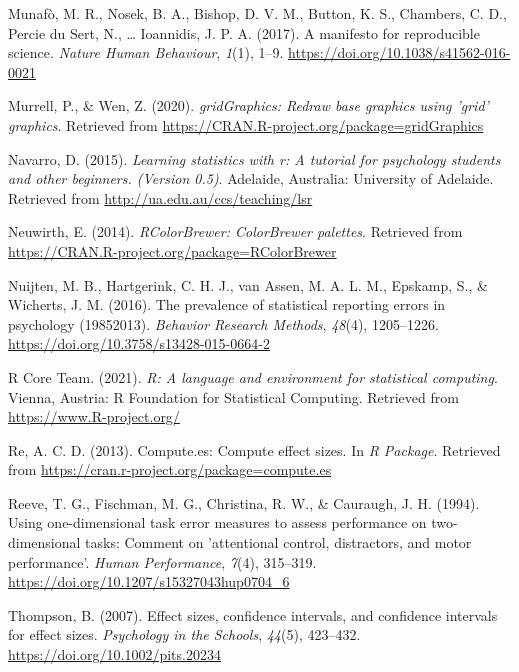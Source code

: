 \documentclass[
  english,
  man, donotrepeattitle,floatsintext]{apa7}
\newlength{\cslhangindent}
\newlength{\cslentryspacingunit} %
\newenvironment{CSLReferences}[2] %
 {%
  \setlength{\parindent}{0pt}
  \ifodd #1
  \let\oldpar\par
  \def\par{\hangindent=\cslhangindent\oldpar}
  \fi
  \setlength{\parskip}{#2\cslentryspacingunit}
 }%
 {}
\begin{document}
\begin{CSLReferences}{1}{0}
\leavevmode{}%
Munafò, M. R., Nosek, B. A., Bishop, D. V. M., Button, K. S., Chambers, C. D., Percie du Sert, N., \ldots{} Ioannidis, J. P. A. (2017). A manifesto for reproducible science. \emph{Nature Human Behaviour}, \emph{1}(1), 1--9. \url{https://doi.org/10.1038/s41562-016-0021}

\leavevmode{}%
Murrell, P., \& Wen, Z. (2020). \emph{gridGraphics: Redraw base graphics using 'grid' graphics}. Retrieved from \url{https://CRAN.R-project.org/package=gridGraphics}

\leavevmode{}%
Navarro, D. (2015). \emph{Learning statistics with r: A tutorial for psychology students and other beginners. (Version 0.5)}. Adelaide, Australia: University of Adelaide. Retrieved from \url{http://ua.edu.au/ccs/teaching/lsr}

\leavevmode{}%
Neuwirth, E. (2014). \emph{RColorBrewer: ColorBrewer palettes}. Retrieved from \url{https://CRAN.R-project.org/package=RColorBrewer}

\leavevmode{}%
Nuijten, M. B., Hartgerink, C. H. J., van Assen, M. A. L. M., Epskamp, S., \& Wicherts, J. M. (2016). The prevalence of statistical reporting errors in psychology (1985{\textendash}2013). \emph{Behavior Research Methods}, \emph{48}(4), 1205--1226. \url{https://doi.org/10.3758/s13428-015-0664-2}

\leavevmode{}%
R Core Team. (2021). \emph{R: A language and environment for statistical computing}. Vienna, Austria: R Foundation for Statistical Computing. Retrieved from \url{https://www.R-project.org/}

\leavevmode{}%
Re, A. C. D. (2013). Compute.es: Compute effect sizes. In \emph{R Package}. Retrieved from \url{https://cran.r-project.org/package=compute.es}

\leavevmode{}%
Reeve, T. G., Fischman, M. G., Christina, R. W., \& Cauraugh, J. H. (1994). Using one-dimensional task error measures to assess performance on two-dimensional tasks: Comment on 'attentional control, distractors, and motor performance'. \emph{Human Performance}, \emph{7}(4), 315--319. \url{https://doi.org/10.1207/s15327043hup0704_6}

\leavevmode{}%
Thompson, B. (2007). Effect sizes, confidence intervals, and confidence intervals for effect sizes. \emph{Psychology in the Schools}, \emph{44}(5), 423--432. \url{https://doi.org/10.1002/pits.20234}


\end{CSLReferences}
\end{document}
